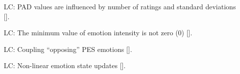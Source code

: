 \begin{itemize}
    \item[LC\refstepcounter{lcnum}\thelcnum\label{LC_PADStats}:]
    PAD values are influenced by number of ratings and standard deviations 
    [].

    \item[LC\refstepcounter{lcnum}\thelcnum\label{LC_PositiveIntensity}:]
    The minimum value of emotion intensity is not zero (0) 
    [].

    \item[LC\refstepcounter{lcnum}\thelcnum\label{LC_EmotionPairs}:]
    Coupling ``opposing'' PES emotions [].

    \item[LC\refstepcounter{lcnum}\thelcnum\label{LC_UpdateEmotionState}:]
    Non-linear emotion state updates [].

\end{itemize}